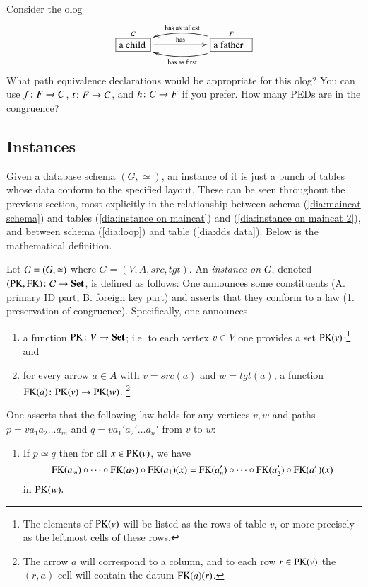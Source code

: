\begin{exercise}\label{exc:father and child}
Consider the olog 
$$
\xymatrix{\obox{C}{.4in}{a child}\LA{rr}{has}&&\obox{F}{.5in}{a father}\ar@/^1pc/[ll]^{\tn{has as first}}\ar@/_1pc/[ll]_{\tn{has as tallest}}}
$$
\sexc What path equivalence declarations would be appropriate for this olog? You can use $f\colon F\rightarrow C$, $t\colon F\rightarrow C$, and $h\colon C\rightarrow F$ if you prefer. 
\next How many PEDs are in the congruence?
\endsexc
\end{exercise}


\subsection{Instances}

Given a database schema $(G,\simeq)$, an instance of it is just a bunch of tables whose data conform to the specified layout. These can be seen throughout the previous section, most explicitly in the relationship between schema (\ref{dia:maincat schema}) and tables (\ref{dia:instance on maincat}) and (\ref{dia:instance on maincat 2}), and between schema (\ref{dia:loop}) and table (\ref{dia:dds data}). Below is the mathematical definition.

\begin{definition}\label{def:instance}

Let $\mathcal{C}=(G,\simeq)$ where $G=(V,A,src,tgt)$. An {\em instance on $\mathcal{C}$}, denoted $(\PK,\FK)\taking\mcC\to\Set$, is defined as follows: One announces some constituents (A. primary ID part, B. foreign key part) and asserts that they conform to a law (1. preservation of congruence). Specifically, one announces
\begin{enumerate}[\hsp A.]
\item a function $\PK\taking V\to \Set$; i.e. to each vertex $v\in V$ one provides a set $\PK(v)$;\footnote{The elements of $\PK(v)$ will be listed as the rows of table $v$, or more precisely as the leftmost cells of these rows.} and
\item for every arrow $a\in A$ with $v=src(a)$ and $w=tgt(a)$, a function $\FK(a)\taking\PK(v)\to\PK(w)$.
\footnote{The arrow $a$ will correspond to a column, and to each row $r\in\PK(v)$ the $(r,a)$ cell will contain the datum $\FK(a)(r)$.}
\end{enumerate}
One asserts that the following law holds for any vertices $v, w$ and paths $p=va_1a_2\ldots a_m$ and $q=va_1'a_2'\ldots a_n'$ from $v$ to $w$:
\begin{enumerate}[\hsp 1.]
\item If $p\simeq q$ then for all $x\in\PK(v)$, we have $$\FK(a_m)\circ\cdots\circ\FK(a_2)\circ\FK(a_1)(x)=\FK(a_n')\circ\cdots\circ\FK(a_2')\circ\FK(a_1')(x)$$ in $\PK(w).$
\end{enumerate}

\end{definition}

